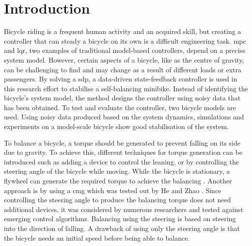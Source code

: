 \chapter{Introduction}
\label{chap:introduction}

Bicycle riding is a frequent human activity and an acquired skill, but creating a controller that can steady a bicycle on its own is a difficult engineering task.
\gls{mpc} and \gls{lqr}, two examples of traditional model-based controllers, depend on a precise system model.
However, certain aspects of a bicycle, like as the centre of gravity, can be challenging to find and may change as a result of different loads or extra passengers.
By solving a \gls{sdp}, a data-driven state-feedback controller is used in this research effort to stabilise a self-balancing minibike.
Instead of identifying the bicycle's system model, the method designs the controller using noisy data that has been obtained.
To test and evaluate the controller, two bicycle models are used.
Using noisy data produced based on the system dynamics, simulations and experiments on a model-scale bicycle show good stabilisation of the system.


To balance a bicycle, a torque should be generated to prevent falling on its side due to gravity. To achieve this, different techniques for torque generation can be introduced such as adding a device to control the leaning, or by controlling the steering angle of the bicycle while moving. While the bicycle is stationary, a flywheel can generate the required torque to achieve the balancing \cite{kawaguchi2011}. Another approach is by using a \gls{cmg} which was tested out by He and Zhao \cite{he2015}. Since controlling the steering angle to produce the balancing torque does not need additional devices, it was considered by numerous researchers and tested against emerging control algorithms. Balancing using the steering is based on steering into the direction of falling. A drawback of using only the steering angle is that the bicycle needs an initial speed before being able to balance.

